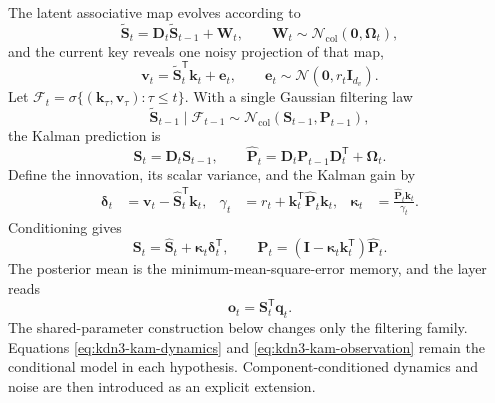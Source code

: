 \documentclass[11pt]{article}
\newcommand{\ve}[1]{\boldsymbol{#1}}
\newcommand{\tr}{\mathsf{T}}
\newcommand{\Normal}{\mathcal{N}}
\begin{document}
The latent associative map evolves according to
\begin{equation}
  \widetilde{\ve{S}}_t
  =\ve{D}_t\widetilde{\ve{S}}_{t-1}+\ve{W}_t,
  \qquad
  \ve{W}_t\sim\Normal_{\mathrm{col}}(\ve{0},\ve{\Omega}_t),
  \label{eq:kdn3-kam-dynamics}
\end{equation}
and the current key reveals one noisy projection of that map,
\begin{equation}
  \ve{v}_t
  =\widetilde{\ve{S}}_t^{\tr}\ve{k}_t+\ve{e}_t,
  \qquad
  \ve{e}_t\sim\Normal(\ve{0},r_t\ve{I}_{d_v}).
  \label{eq:kdn3-kam-observation}
\end{equation}
Let
$\mathcal{F}_t=\sigma\{(\ve{k}_\tau,\ve{v}_\tau):\tau\leq t\}$.
With a single Gaussian filtering law
\begin{equation}
  \widetilde{\ve{S}}_{t-1}\mid\mathcal{F}_{t-1}
  \sim\Normal_{\mathrm{col}}(\ve{S}_{t-1},\ve{P}_{t-1}),
  \label{eq:kdn3-single-filtering-law}
\end{equation}
the Kalman prediction is
\begin{equation}
  \widehat{\ve{S}}_t=\ve{D}_t\ve{S}_{t-1},
  \qquad
  \widehat{\ve{P}}_t
  =\ve{D}_t\ve{P}_{t-1}\ve{D}_t^{\tr}+\ve{\Omega}_t.
  \label{eq:kdn3-single-predict}
\end{equation}
Define the innovation, its scalar variance, and the Kalman gain by
\begin{equation}
\begin{aligned}
  \ve{\delta}_t
  &=\ve{v}_t-\widehat{\ve{S}}_t^{\tr}\ve{k}_t,
  &
  \gamma_t
  &=r_t+\ve{k}_t^{\tr}\widehat{\ve{P}}_t\ve{k}_t,
  &
  \ve{\kappa}_t
  &=\frac{\widehat{\ve{P}}_t\ve{k}_t}{\gamma_t}.
\end{aligned}
  \label{eq:kdn3-single-innovation}
\end{equation}
Conditioning gives
\begin{equation}
  \ve{S}_t
  =\widehat{\ve{S}}_t+\ve{\kappa}_t\ve{\delta}_t^{\tr},
  \qquad
  \ve{P}_t
  =(\ve{I}-\ve{\kappa}_t\ve{k}_t^{\tr})\widehat{\ve{P}}_t.
  \label{eq:kdn3-single-update}
\end{equation}
The posterior mean is the minimum-mean-square-error memory, and the layer reads
\begin{equation}
  \ve{o}_t=\ve{S}_t^{\tr}\ve{q}_t.
  \label{eq:kdn3-single-read}
\end{equation}
The shared-parameter construction below changes only the filtering family.  Equations
\eqref{eq:kdn3-kam-dynamics} and \eqref{eq:kdn3-kam-observation} remain the conditional model in
each hypothesis.  Component-conditioned dynamics and noise are then introduced as an explicit
extension.
\end{document}
